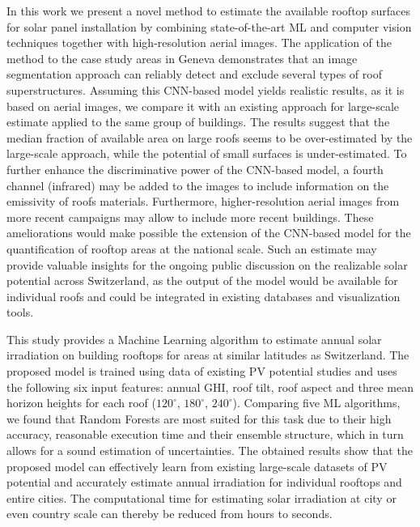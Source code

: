 In this work we present a novel method to estimate the available rooftop surfaces for solar panel installation by combining state-of-the-art ML and computer vision techniques together with high-resolution aerial images. The application of the method to the case study areas in Geneva demonstrates that an image segmentation approach can reliably detect and exclude several types of roof superstructures. Assuming this CNN-based model yields realistic results, as it is based on aerial images, we compare it with an existing approach for large-scale estimate applied to the same group of buildings. The results suggest that the median fraction of available area on large roofs seems to be over-estimated by the large-scale approach, while the potential of small surfaces is under-estimated. To further enhance the discriminative power of the CNN-based model, a fourth channel (infrared) may be added to the images to include information on the emissivity of roofs materials. Furthermore, higher-resolution aerial images from more recent campaigns may allow to include more recent buildings. These ameliorations would make possible the extension of the CNN-based model for the quantification of rooftop areas at the national scale. Such an estimate may provide valuable insights for the ongoing public discussion on the realizable solar potential across Switzerland, as the output of the model would be available for individual roofs and could be integrated in existing databases and visualization tools.

This study provides a Machine Learning algorithm to estimate annual solar irradiation on building rooftops for areas at similar latitudes as Switzerland. The proposed model is trained using data of existing PV potential studies and uses the following six input features: annual GHI, roof tilt, roof aspect and three mean horizon heights for each roof ($120^\circ$, $180^\circ$, $240^\circ$). Comparing five ML algorithms, we found that Random Forests are most suited for this task due to their high accuracy, reasonable execution time and their ensemble structure, which in turn allows for a sound estimation of uncertainties. The obtained results show that the proposed model can effectively learn from existing large-scale datasets of PV potential and accurately estimate annual irradiation for individual rooftops and entire cities. The computational time for estimating solar irradiation at city or even country scale can thereby be reduced from hours to seconds.
